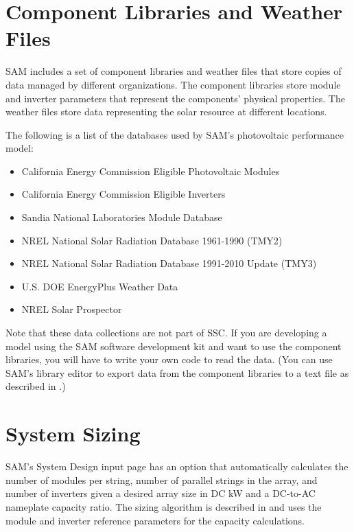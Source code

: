 \documentclass[12pt,letterpaper]{article}
\begin{document}
\section{Component Libraries and Weather Files} \label{sec-libraries}

SAM includes a set of component libraries and weather files that store copies of data managed by different organizations. The component libraries store module and inverter parameters that represent the components' physical properties. The weather files store data representing the solar resource at different locations.

The following is a list of the databases used by SAM's photovoltaic performance model:
\begin{itemize}
\item California Energy Commission Eligible Photovoltaic Modules \citep{gsc2014b}
\item California Energy Commission Eligible Inverters \citep{gsc2014c}
\item Sandia National Laboratories Module Database \citep{sandia-testeval}
\item NREL National Solar Radiation Database 1961-1990 (TMY2) \citep{nsrdb}
\item NREL National Solar Radiation Database 1991-2010 Update (TMY3) \citep{nsrdb}
\item U.S. DOE EnergyPlus Weather Data \citep{epw}
\item NREL Solar Prospector \citep{solarprospector}
\end{itemize}

Note that these data collections are not part of SSC. If you are developing a model using the SAM software development kit and want to use the component libraries, you will have to write your own code to read the data. (You can use SAM's library editor to export data from the component libraries to a text file as described in \citet{help-libraries}.)

\section{System Sizing} \label{sec-sizing}

SAM's System Design input page has an option that automatically calculates the number of modules per string, number of parallel strings in the array, and number of inverters given a desired array size in DC kW and a DC-to-AC nameplate capacity ratio. The sizing algorithm is described in \citet{help-sizing} and uses the module and inverter reference parameters for the capacity calculations.
\end{document}
